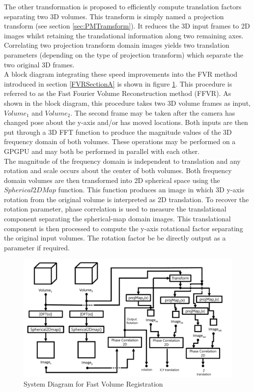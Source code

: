 The other transformation is proposed to efficiently compute translation factors separating two 3D volumes. This transform is simply named a projection transform (see section \ref{sec:PMTramsform}). It reduces the 3D input frames to 2D images whilst retaining the translational information along two remaining axes. Correlating two projection transform domain images yields two translation parameters (depending on the type of projection transform) which separate the two original 3D frames. \\

A block diagram integrating these speed improvements into the FVR method introduced in section \ref{FVRSectionA} is shown in figure \ref{fig:PIPELINE3}. This procedure is referred to as the Fast Fourier Volume Reconstruction method (FFVR). As shown in the block diagram, this procedure takes two 3D volume frames as input, $Volume_1$ and $Volume_2$. The second frame may be taken after the camera has changed pose about the y-axis and/or has moved locations. Both inputs are then put through a 3D FFT function to produce the magnitude values of the 3D frequency domain of both volumes. These operations may be performed on a GPGPU and may both be performed in parallel with each other. \\

The magnitude of the frequency domain is independent to translation and any rotation and scale occurs about the center of both volumes. Both frequency domain volumes are then transformed into 2D spherical space using the $Spherical2DMap$ function. This function produces an image in which 3D y-axis rotation from the original volume is interpreted as 2D translation. To recover the rotation parameter, phase correlation is used to measure the translational component separating the spherical-map domain images. This translational component is then processed to compute the y-axis rotational factor separating the original input volumes. The rotation factor be be directly output as a parameter if required. \\


\begin{figure}[!htb]
\centering
\includegraphics[width=5.0in]{images/ch2/pipeline3}
\caption{System Diagram for Fast Volume Registration}
\label{fig:PIPELINE3}
\end{figure}

